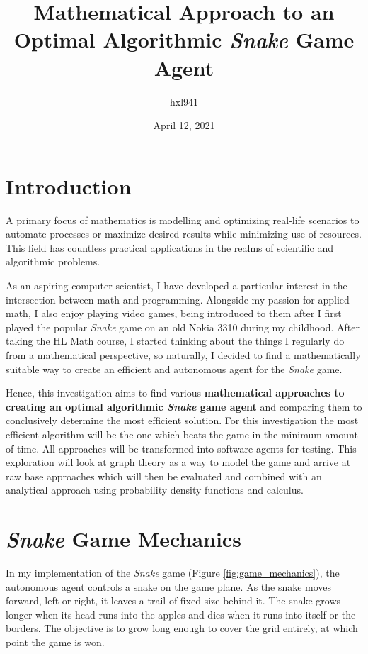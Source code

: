 \documentclass[12pt]{article}
\title{Mathematical Approach to an Optimal Algorithmic \textit{Snake} Game Agent}
\author{hxl941}
\date{April 12, 2021}
\begin{document}
\begin{singlespace}
\maketitle
\thispagestyle{empty}
\tableofcontents
\end{singlespace}

\clearpage
\setcounter{page}{1}
\pagebreak


\section{Introduction}

A primary focus of mathematics is modelling and optimizing real-life scenarios to automate processes or maximize desired results while minimizing use of resources. This field has countless practical applications in the realms of scientific and algorithmic problems.

As an aspiring computer scientist, I have developed a particular interest in the intersection between math and programming. Alongside my passion for applied math, I also enjoy playing video games, being introduced to them after I first played the popular \textit{Snake} game on an old Nokia 3310 during my childhood. After taking the HL Math course, I started thinking about the things I regularly do from a mathematical perspective, so naturally, I decided to find a mathematically suitable way to create an efficient and autonomous agent for the \textit{Snake} game.

Hence, this investigation aims to find various \textbf{mathematical approaches to creating an optimal algorithmic \textit{Snake} game agent} and comparing them to conclusively determine the most efficient solution. For this investigation the most efficient algorithm will be the one which beats the game in the minimum amount of time. All approaches will be transformed into software agents for testing. This exploration will look at graph theory as a way to model the game and arrive at raw base approaches which will then be evaluated and combined with an analytical approach using probability density functions and calculus. 

\section{\textit{Snake} Game Mechanics}

In my implementation of the \textit{Snake} game (Figure \ref{fig:game_mechanics}), the autonomous agent controls a snake on the game plane. As the snake moves forward, left or right, it leaves a trail of fixed size behind it. The snake grows longer when its head runs into the apples and dies when it runs into itself or the borders. The objective is to grow long enough to cover the grid entirely, at which point the game is won.
\end{document}
